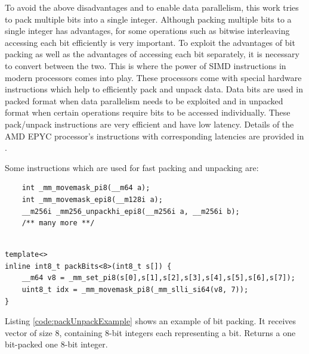 To avoid the above disadvantages and to enable data parallelism, this work tries to pack multiple bits into a single integer. Although packing multiple bits to a single integer has advantages, for some operations such as bitwise interleaving accessing each bit efficiently is very important. To exploit the advantages of bit packing as well as the advantages of accessing each bit separately, it is necessary to convert between the two. This is where the power of SIMD instructions in modern processors comes into play. These processors come with special hardware instructions which help to efficiently pack and unpack data. Data bits are used in packed format when data parallelism needs to be exploited and in unpacked format when certain operations require bits to be accessed individually. These pack/unpack instructions are very efficient and have low latency. Details of the AMD EPYC processor's instructions with corresponding latencies are provided in \cite{AgnerFog}.

Some instructions which are used for fast packing and unpacking are:
\begin{code}
	\label{code:samplepackUnpack}
\begin{verbatim}
	int _mm_movemask_pi8(__m64 a);
	int _mm_movemask_epi8(__m128i a);
	__m256i _mm256_unpackhi_epi8(__m256i a, __m256i b);
	/** many more **/
	
\end{verbatim}
\end{code}


\begin{code}
	\label{code:packUnpackExample}
	\begin{verbatim}
template<>
inline int8_t packBits<8>(int8_t s[]) {
	__m64 v8 = _mm_set_pi8(s[0],s[1],s[2],s[3],s[4],s[5],s[6],s[7]);	
	uint8_t idx = _mm_movemask_pi8(_mm_slli_si64(v8, 7));
}
\end{verbatim}
\end{code}

Listing \ref{code:packUnpackExample} shows an example of bit packing. It receives vector of size 8, containing 8-bit integers each representing a bit. Returns a one bit-packed one 8-bit integer.

